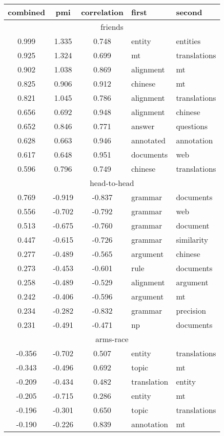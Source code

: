 \begin{tabular}{cccp{5cm}p{5cm}}
\toprule
combined & pmi & correlation & first & second\\
\midrule
\multicolumn{5}{c}{friends}\\
0.999 & 1.335 & 0.748 & entity & entities \\
0.925 & 1.324 & 0.699 & mt & translations \\
0.902 & 1.038 & 0.869 & alignment & mt \\
0.825 & 0.906 & 0.912 & chinese & mt \\
0.821 & 1.045 & 0.786 & alignment & translations \\
0.656 & 0.692 & 0.948 & alignment & chinese \\
0.652 & 0.846 & 0.771 & answer & questions \\
0.628 & 0.663 & 0.946 & annotated & annotation \\
0.617 & 0.648 & 0.951 & documents & web \\
0.596 & 0.796 & 0.749 & chinese & translations \\
\midrule
\multicolumn{5}{c}{head-to-head}\\
0.769 & -0.919 & -0.837 & grammar & documents \\
0.556 & -0.702 & -0.792 & grammar & web \\
0.513 & -0.675 & -0.760 & grammar & document \\
0.447 & -0.615 & -0.726 & grammar & similarity \\
0.277 & -0.489 & -0.565 & argument & chinese \\
0.273 & -0.453 & -0.601 & rule & documents \\
0.258 & -0.489 & -0.529 & alignment & argument \\
0.242 & -0.406 & -0.596 & argument & mt \\
0.234 & -0.282 & -0.832 & grammar & precision \\
0.231 & -0.491 & -0.471 & np & documents \\
\midrule
\multicolumn{5}{c}{arms-race}\\
-0.356 & -0.702 & 0.507 & entity & translations \\
-0.343 & -0.496 & 0.692 & topic & mt \\
-0.209 & -0.434 & 0.482 & translation & entity \\
-0.205 & -0.715 & 0.286 & entity & mt \\
-0.196 & -0.301 & 0.650 & topic & translations \\
-0.190 & -0.226 & 0.839 & annotation & mt \\

\end{tabular}
